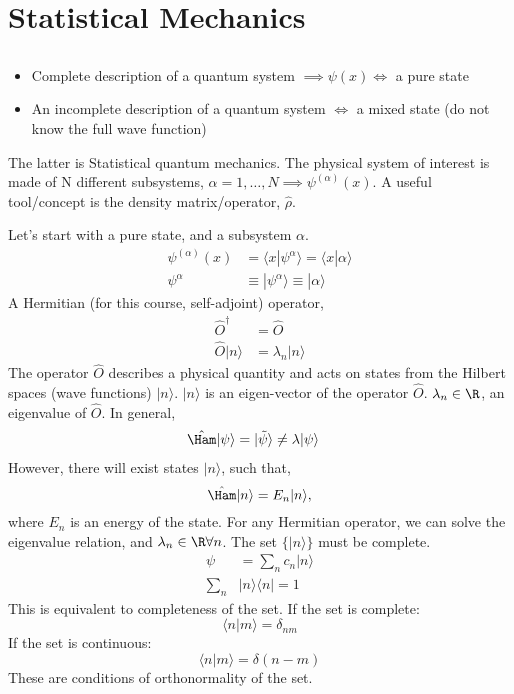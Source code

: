 \documentclass[a4paper, 11pt, normalem]{report}
\newcommand{\dens}{\hat{\rho}}
\begin{document}
\part{Statistical Mechanics}
\chapter{}
\begin{itemize}
    \item Complete description of a quantum system $\implies \psi(x) \iff$ a pure state
    \item An incomplete description of a quantum system $\iff$ a mixed state (do not know the full wave function)
\end{itemize}
The latter is Statistical quantum mechanics.
The physical system of interest is made of N different subsystems, $\alpha = 1,\dots,N \implies \psi^{(\alpha)}(x)$.
A useful tool/concept is the density matrix/operator, $\dens$.

Let's start with a pure state, and a subsystem $\alpha$.
\begin{align}
    \psi^{(\alpha)}(x) &= \langle x|\psi^\alpha\rangle = \langle x|\alpha\rangle \\
    \psi^\alpha &\equiv |\psi^\alpha\rangle \equiv |\alpha\rangle
\end{align}
A Hermitian (for this course, self-adjoint) operator,
\begin{align}
    \hat{O}^\dagger &= \hat{O} \\
    \hat{O}|n\rangle &= \lambda_n|n\rangle
\end{align}
The operator $\hat{O}$ describes a physical quantity and acts on states from the Hilbert spaces (wave functions) $|n\rangle$.
$|n\rangle$ is an eigen-vector of the operator $\hat{O}$. 
$\lambda_n \in \R$, an eigenvalue of $\hat{O}$.
In general, 
\begin{align}
    \hat{\Ham}|\psi\rangle &= |\tilde{\psi}\rangle \neq \lambda|\psi\rangle
\end{align}
However, there will exist states $|n\rangle$, such that,
\begin{equation}
    \hat{\Ham}|n\rangle = E_n|n\rangle,
\end{equation}
where $E_n$ is an energy of the state.
For any Hermitian operator, we can solve the eigenvalue relation, and $\lambda_n \in \R \forall n$. 
The set $\{|n\rangle\}$ must be complete.
\begin{align}
    \psi &= \sum_n c_n|n\rangle \\
    \sum_n &|n\rangle\langle n| = 1
\end{align}
This is equivalent to completeness of the set.
If the set is complete:
\begin{equation}
    \langle n|m\rangle = \delta_{nm}
\end{equation}
If the set is continuous:
\begin{equation}
    \langle n|m\rangle = \delta(n-m)
\end{equation}
These are conditions of orthonormality of the set.
\end{document}
